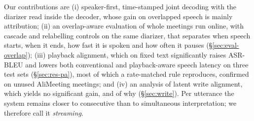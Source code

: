 Our contributions are (i) speaker-first, time-stamped joint decoding with the diarizer read inside the decoder, whose
gain on overlapped speech is mainly attribution; (ii) an overlap-aware evaluation of whole meetings run online, with
cascade and relabelling controls on the same diarizer, that separates when speech starts, when it ends, how fast it is
spoken and how often it pauses (\S\ref{sec:eval-overlap}); (iii) playback alignment, which on fixed text significantly
raises ASR-BLEU and lowers both conventional and playback-aware speech latency on three test sets
(\S\ref{sec:res-pa})\ifFactorial{}, most of which a rate-matched rule reproduces\fi\ifAliEval{}, confirmed on unused
AliMeeting meetings\fi; and (iv) an analysis of latent write alignment, which yields no significant gain, and of why
(\S\ref{sec:write}). Per utterance the system remains closer to consecutive than to simultaneous interpretation; we
therefore call it \emph{streaming}.
